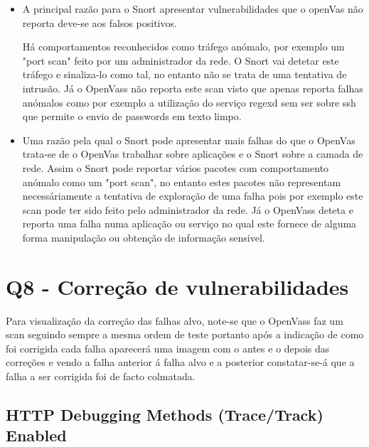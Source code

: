\begin{itemize}
\item A principal razão para o Snort apresentar vulnerabilidades que o openVas não reporta deve-se aos falsos positivos.
\par Há comportamentos reconhecidos como tráfego anómalo, por exemplo um "port scan" feito por um administrador da rede. O Snort vai detetar este tráfego e sinaliza-lo como tal, no entanto não se trata de uma tentativa de intrusão. Já o OpenVass não reporta este scan visto que apenas reporta falhas anómalos como por exemplo a utilização do serviço regexd sem ser sobre ssh que permite o envio de passwords em texto limpo.   

\item Uma razão pela qual o Snort pode apresentar mais falhas do que o OpenVas trata-se de o OpenVas trabalhar sobre aplicações e o Snort sobre a camada de rede. Assim o Snort pode reportar vários pacotes com comportamento anómalo como um "port scan", no entanto estes pacotes não representam necessáriamente a tentativa de exploração de uma falha pois por exemplo este scan pode ter sido feito pelo administrador da rede. Já o OpenVass deteta e reporta uma falha numa aplicação ou serviço no qual este fornece de alguma forma manipulação ou obtenção de informação sensivel.

\end{itemize}
\section{Q8 - Correção de vulnerabilidades}

\par Para visualização da correção das falhas alvo, note-se que o OpenVass faz um scan seguindo sempre a mesma ordem de teste portanto após a indicação de como foi corrigida cada falha aparecerá uma imagem com o antes e o depois das correções e vendo a falha anterior á falha alvo e a posterior constatar-se-á que a falha a ser corrigida foi de facto colmatada.

\subsection{HTTP Debugging Methods (Trace/Track) Enabled}

